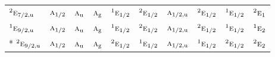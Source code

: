 \documentclass[10pt,a4paper]{article}
\numberwithin{equation}{section}
\newcommand{\irr}[1]{\text{\normalfont\scshape #1}}
\newcommand{\conjpair}[1]{{}^{#1}}
\newcommand{\ptag}[1]{\mathrm{#1}}
\begin{document}
{\begin{longtable}{@{}lccccccccc@{}}
$\conjpair{2}\irr{e}_{7/2,\ptag{u}}$ & $\irr{a}_{1/2}$ & $\irr{a}_{\ptag{u}}$ & $\irr{a}_{\ptag{g}}$ & $\conjpair{1}\irr{e}_{1/2}$ & $\conjpair{2}\irr{e}_{1/2}$ & $\irr{a}_{1/2,\ptag{u}}$ & $\conjpair{2}\irr{e}_{1/2}$ & $\conjpair{1}\irr{e}_{1/2}$ & $\conjpair{2}\irr{e}_{1}$\\
$\conjpair{1}\irr{e}_{9/2,\ptag{u}}$ & $\irr{a}_{1/2}$ & $\irr{a}_{\ptag{u}}$ & $\irr{a}_{\ptag{g}}$ & $\conjpair{1}\irr{e}_{1/2}$ & $\conjpair{2}\irr{e}_{1/2}$ & $\irr{a}_{1/2,\ptag{u}}$ & $\conjpair{2}\irr{e}_{1/2}$ & $\conjpair{1}\irr{e}_{1/2}$ & $\conjpair{1}\irr{e}_{2}$\\*
$\conjpair{2}\irr{e}_{9/2,\ptag{u}}$ & $\irr{a}_{1/2}$ & $\irr{a}_{\ptag{u}}$ & $\irr{a}_{\ptag{g}}$ & $\conjpair{2}\irr{e}_{1/2}$ & $\conjpair{1}\irr{e}_{1/2}$ & $\irr{a}_{1/2,\ptag{u}}$ & $\conjpair{1}\irr{e}_{1/2}$ & $\conjpair{2}\irr{e}_{1/2}$ & $\conjpair{2}\irr{e}_{2}$\\
\bottomrule\end{longtable}}
\end{document}
